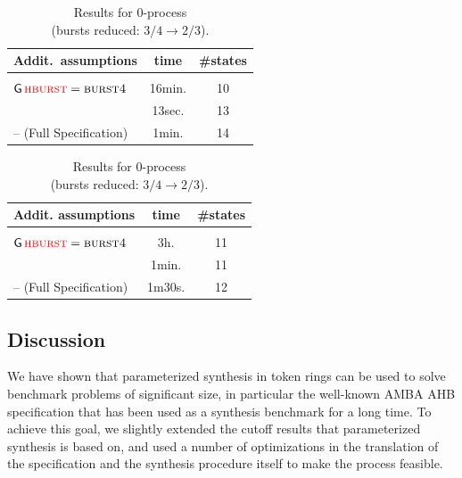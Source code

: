 \begin{table}[tb]
\footnotesize
\centering
\begin{minipage}[b]{0.45\textwidth}
\centering
\begin{tabular}{ l|cc }
Addit.\ assumptions                          & time & \#states \\
\hline
\rule{0pt}{3ex} \specialcellC{$\always \hlock$ \\ $\always \hburst=\hburstfour$} 
                       & 16min.  & 10  \\
\hline
\rule{0pt}{2ex} \specialcellC{$\always \hburst=\hburstfour$} & 13sec.  & 13  \\
\hline
\rule{0pt}{2ex} 
-- (Full Specification) & 1min.  & 14 \\
\end{tabular}
\caption{Results for non-$0$ process.\\~}
\label{amba:tab:non-zero-process}
\end{minipage}
% 
\hspace{0.5cm}
% 
\begin{minipage}[b]{0.45\textwidth}
\centering
\begin{tabular}{ l|cc }
Addit. assumptions & time & \#states \\
\hline
\rule{0pt}{3ex} \specialcellC{$\always \hlock$ \\ $\always \hburst=\hburstfour$} 
                       & 3h.  & 11  \\
\hline
\rule{0pt}{2ex} \specialcellC{$\always \hburst=\hburstfour$} & 1min.  & 11  \\
\hline
\rule{0pt}{2ex} 
-- (Full Specification) & 1m30s.  & 12 \\
\end{tabular}
\caption{Results for $0$-process \\ (bursts reduced: $3/4 \rightarrow 2/3$).}
\label{amba:tab:zero-process}
\end{minipage}
\end{table}



\subsection{Discussion}

We have shown that parameterized synthesis in token rings can be used to 
solve benchmark problems of significant size, in particular the well-known 
AMBA AHB specification that has been used as a synthesis benchmark for a long 
time. To achieve this goal, we slightly extended the cutoff results that 
parameterized synthesis is based on, and used a number of optimizations in 
the translation of the specification and the synthesis procedure itself to 
make the process feasible.

